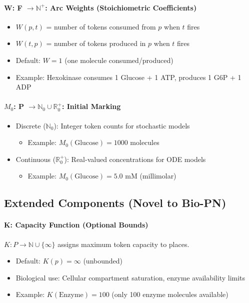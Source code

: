\paragraph{W: F $\to \mathbb{N}^+$: Arc Weights (Stoichiometric Coefficients)}
\begin{itemize}
    \item $W(p,t)$ = number of tokens consumed from $p$ when $t$ fires
    \item $W(t,p)$ = number of tokens produced in $p$ when $t$ fires
    \item Default: $W = 1$ (one molecule consumed/produced)
    \item Example: Hexokinase consumes 1 Glucose + 1 ATP, produces 1 G6P + 1 ADP
\end{itemize}

\paragraph{$M_0$: P $\to \mathbb{N}_0 \cup \mathbb{R}_0^+$: Initial Marking}
\begin{itemize}
    \item Discrete ($\mathbb{N}_0$): Integer token counts for stochastic models
        \begin{itemize}
            \item Example: $M_0(\text{Glucose}) = 1000$ molecules
        \end{itemize}
    \item Continuous ($\mathbb{R}_0^+$): Real-valued concentrations for ODE models
        \begin{itemize}
            \item Example: $M_0(\text{Glucose}) = 5.0$ mM (millimolar)
        \end{itemize}
\end{itemize}

\subsection{Extended Components (Novel to Bio-PN)}
\label{subsec:extended-components}

\paragraph{K: Capacity Function (Optional Bounds)}
$K: P \to \mathbb{N} \cup \{\infty\}$ assigns maximum token capacity to places.
\begin{itemize}
    \item Default: $K(p) = \infty$ (unbounded)
    \item Biological use: Cellular compartment saturation, enzyme availability limits
    \item Example: $K(\text{Enzyme}) = 100$ (only 100 enzyme molecules available)
\end{itemize}

